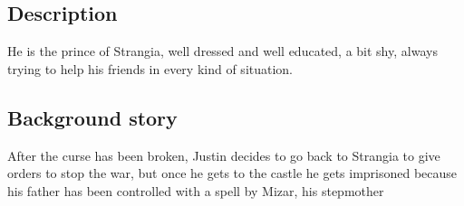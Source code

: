\subsection{Description}
He is the prince of Strangia, well dressed and well educated, a bit shy, always trying to help his friends in every kind of situation.

\subsection{Background story}
 After the curse has been broken, Justin decides to go back to Strangia to give orders to stop the war, but once he gets to the castle he gets imprisoned because his father has been controlled with a spell by Mizar, his stepmother



